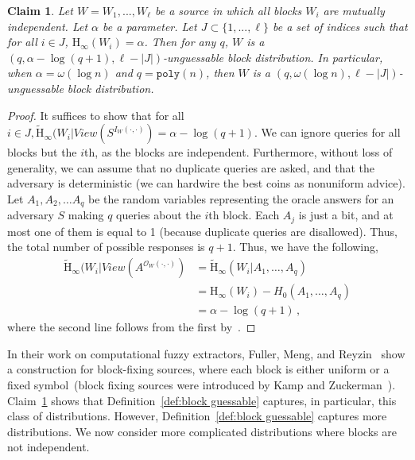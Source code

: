 \documentclass[11pt]{article}
\newcommand{\defref}[1]{\mbox{Definition~\ref{#1}}}
\newcommand{\clref}[1]{\mbox{Claim~\ref{#1}}}
\newcommand{\poly}{\ensuremath{\mathtt{poly}}\xspace}
\newcommand{\Hoo}{\mathrm{H}_\infty}
\newcommand{\Hav}{\tilde{\mathrm{H}}_\infty}
\newtheorem{claim}[theorem]{Claim}
\begin{document}
\begin{claim}
\label{cl:independent high ent}
Let $W = W_1,  ... , W_\ell$ be a source in which all blocks $W_i$  are mutually independent.  Let $\alpha$ be a parameter.  Let $J\subset \{1,..., \ell\}$ be a set of indices such that for all $i\in J$, $\Hoo(W_i ) =\alpha $.  Then for any $q$, $W$ is a $(q, \alpha - \log (q+1), \ell - |J|)$-unguessable block distribution.  In particular, when $\alpha = \omega(\log n)$ and $q = \poly(n)$, then $W$ is a $(q, \omega(\log n), \ell - |J|)$-unguessable block distribution.
\end{claim}
\begin{proof}
It suffices to show that for all $i\in J, \Hav(W_i |View(S^{I_{W}(\cdot, \cdot)}) = \alpha -\log (q+1)$.
We can ignore queries for all blocks but the $i$th, as the blocks are independent. Furthermore, without loss of generality, we can assume that no duplicate queries are asked, and that the adversary is deterministic (we can hardwire the best coins as nonuniform advice). Let $A_1, A_2, \dots A_q$ be the random variables representing the oracle answers for an  adversary $S$ making $q$  queries about the $i$th block. Each $A_j$ is just a bit, and at most one of them  is equal to 1 (because duplicate queries are disallowed). Thus, the total number of possible responses is $q+1$. Thus, we have the following,
\begin{align*}
\Hav(W_i | View(A^{\mathcal{O}_{W}(\cdot, \cdot)}) &= \Hav(W_i| A_1, \dots, A_q)\\
&=\Hoo(W_i) - H_0(A_1, \dots, A_q)\\
&=\alpha - \log (q+1)\,,
\end{align*}
where the second line follows from the first by~\cite[Lemma 2.2]{DBLP:journals/siamcomp/DodisORS08}.
\end{proof}
\noindent In their work on computational fuzzy extractors, Fuller, Meng, and Reyzin~\cite{fuller2013computational} show a construction for block-fixing sources, where each block is either uniform or a fixed symbol~(block fixing sources were introduced by Kamp and Zuckerman~\cite{KZ07}).  \clref{cl:independent high ent} shows that \defref{def:block guessable} captures, in particular, this class of distributions.
However, \defref{def:block guessable} captures more distributions.  We now consider more complicated distributions where blocks are not independent.
\end{document}
